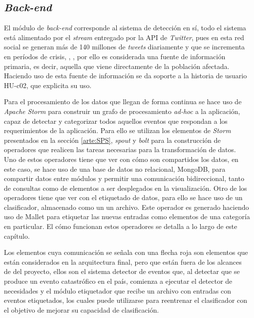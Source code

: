 \subsection{\textit{Back-end}}
\label{subsec:backend}

El módulo de \textit{back-end} corresponde al sistema de detección en sí, todo el sistema está alimentado por el \textit{stream} entregado por la API de \textit{Twitter}, pues en esta red social se generan más de 140 millones de \textit{tweets} diariamente y que se incrementa en períodos de crisis, \cite{TaxonomiaChato}, \cite{StormIBM}, por ello es considerada una fuente de información primaria, es decir, aquella que viene directamente de la población afectada. Haciendo uso de esta fuente de información se da soporte a la historia de usuario HU-c02, que explicita su uso.

Para el procesamiento de los datos que llegan de forma continua se hace uso de \textit{Apache Storm} para construir un grafo de procesamiento \textit{ad-hoc} a la aplicación, capaz de detectar y categorizar todos aquellos eventos que respondan a los requerimientos de la aplicación. Para ello se utilizan los elementos de \textit{Storm} presentados en la sección \ref{arte:SPS}, \textit{spout} y \textit{bolt} para la construcción de operadores que realicen las tareas necesarias para la transformación de datos. Uno de estos operadores tiene que ver con cómo son compartidos los datos, en este caso, se hace uso de una base de datos no relacional, MongoDB, para compartir datos entre módulos y permitir una comunicación bidireccional, tanto de consultas como de elementos a ser desplegados en la visualización. Otro de los operadores tiene que ver con el etiquetado de datos, para ello se hace uso de un clasificador, almacenado como un un archivo. Este operador es generado haciendo uso de Mallet para etiquetar las nuevas entradas como elementos de una categoría en particular. El cómo funcionan estos operadores se detalla a lo largo de este capítulo.

Los elementos cuya comunicación se señala con una flecha roja son elementos que están considerados en la arquitectura final, pero que están fuera de los alcances de del proyecto, ellos son el sistema detector de eventos que, al detectar que se produce un evento catastrófico en el país, comienza a ejecutar el detector de necesidades y el módulo etiquetador que recibe un archivo con entradas con eventos etiquetados, los cuales puede utilizarse para reentrenar el clasificador con el objetivo de mejorar su capacidad de clasificación.

